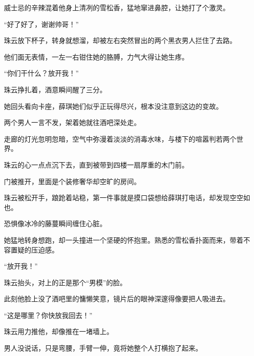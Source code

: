 \documentclass[12pt,a4paper]{article}
\begin{document}
威士忌的辛辣混着他身上清冽的雪松香，猛地窜进鼻腔，让她打了个激灵。



“好了好了，谢谢帅哥！”



珠云放下杯子，转身就想溜，却被左右突然冒出的两个黑衣男人拦住了去路。



他们面无表情，一左一右钳住她的胳膊，力气大得让她生疼。



“你们干什么？放开我！”



珠云挣扎着，酒意瞬间醒了三分。



她回头看向卡座，薛琪她们似乎正玩得尽兴，根本没注意到这边的变故。



两个男人一言不发，架着她就往酒吧深处走。



走廊的灯光忽明忽暗，空气中弥漫着淡淡的消毒水味，与楼下的喧嚣判若两个世界。



珠云的心一点点沉下去，直到被带到四楼一扇厚重的木门前。



门被推开，里面是个装修奢华却空旷的房间。



珠云被松开手，踉跄着站稳，第一件事就是摸口袋想给薛琪打电话，却发现空空如也。



恐惧像冰冷的藤蔓瞬间缠住心脏。



她猛地转身想跑，却一头撞进一个坚硬的怀抱里。熟悉的雪松香扑面而来，带着不容置疑的压迫感。



“放开我！”



珠云抬头，对上的正是那个“男模”的脸。



此刻他脸上没了酒吧里的慵懒笑意，镜片后的眼神深邃得像要把人吸进去。



“这是哪里？你快放我回去！”



珠云用力推他，却像推在一堵墙上。



男人没说话，只是弯腰，手臂一伸，竟将她整个人打横抱了起来。
\end{document}
